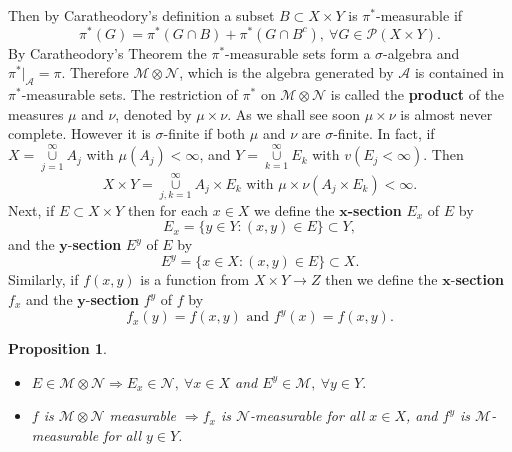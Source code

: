 \documentclass[12pt]{report}
\newtheorem{prop}[theorem]{Proposition}
\begin{document}
\medskip
\noindent Then by Caratheodory's definition a subset $B \subset X
\times Y$  is
$\pi^*$-measurable if
\[
\pi^* (G) = \pi^* (G \cap B) + \pi^*(G \cap B^c), \ \forall G \in \mathcal{P}
(X \times Y).
\] By Caratheodory's Theorem the $\pi^*$-measurable sets form a
$\sigma$-algebra and $\pi^*|_{\mathcal{A}} = \pi$.  Therefore
$\mathcal{M} \otimes \mathcal{N}$, which is the algebra generated by
$\mathcal{A}$ is contained in $\pi^*$-measurable sets.  The restriction
of $\pi^*$ on $\mathcal{M} \otimes \mathcal{N}$ is called the
\textbf{product} of the measures $\mu$ and $\nu$,  denoted by
$\mu \times \nu$.  As we shall see soon $\mu \times \nu$ is almost 
never complete.  However it is $\sigma$-finite if both $\mu$ and
$\nu$ are
$\sigma$-finite.  In fact, if $X = \overset{\infty}{\underset{j=1}{\cup}} 
A_j$ with
$\mu(A_j) < \infty$, and $Y = \overset{\infty}{\underset{k=1}{\cup}}  E_k$
with
$v(E_j < \infty)$.  Then
 \[ X \times Y = \overset{\infty}{\underset{j, k =1}{\cup}}  A_j \times E_k
\mbox{ with } \mu
\times \nu (A_j \times E_k) < \infty.
\]
 Next, if $E \subset X \times Y$ then for each $x \in X$ we define
the
\textbf{$\mathbf{x}$-section} $E_x$ of $E$ by
\[ E_x = \{y \in Y: (x, y) \in E\}\subset Y, 
\]
and the $\mathbf{y}$-\textbf{section} $E^y$ of $E$ by
\[ E^y = \{x \in X: (x, y) \in E\} \subset X.  
\]
Similarly, if $f(x, y)$ is a function from $X \times Y\to Z$ then we define
the
$\mathbf{x}$-\textbf{section} $f_x$  and the
$\mathbf{y}$-\textbf{section}
$f^y$ of
$f$ by
\[ f_x (y) = f(x, y) \mbox{ and } f^y (x) = f(x, y).
\]
\begin{prop}
\begin{itemize}
\item[a.]  $E \in \mathcal{M} \otimes \mathcal{N} \Longrightarrow E_x \in
\mathcal{N}, \ \forall x \in X$ and $E^y \in \mathcal{M}, \ \forall y \in Y.$
\item[b.] $f$ is $\mathcal{M} \otimes \mathcal{N}$ measurable
$\Longrightarrow f_x$ is $\mathcal{N}$-measurable for all $x \in X$, and 
$f^y$ is
$\mathcal{M}$-measurable for all $y \in Y$.
\end{itemize}
\end{prop}
\end{document}
